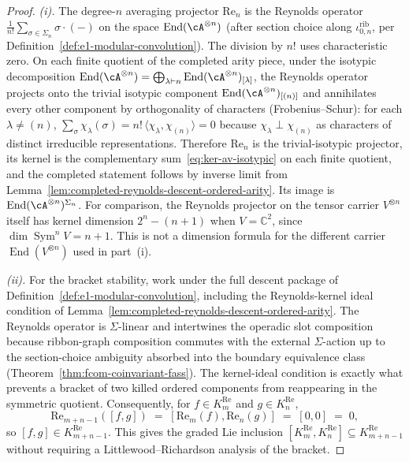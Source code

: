 \begin{proof}
\emph{(i).} The degree-$n$ averaging projector $\mathrm{Re}_n$ is the Reynolds
operator $\frac{1}{n!}\sum_{\sigma\in\Sigma_n}\sigma\cdot(-)$ on the
space $\operatorname{End}(\cA^{\otimes n})$ (after section choice
along $\iota^{\mathrm{rib}}_{0,n}$, per
Definition~\ref{def:e1-modular-convolution}). The division by \(n!\)
uses characteristic zero. On each finite quotient of the completed
arity piece, under the isotypic
decomposition $\operatorname{End}(\cA^{\otimes n})=
\bigoplus_{\lambda\vdash n}\operatorname{End}(\cA^{\otimes n})_{[\lambda]}$,
the Reynolds operator projects onto the trivial isotypic component
$\operatorname{End}(\cA^{\otimes n})_{[(n)]}$ and annihilates every
other component by orthogonality of characters
(Frobenius--Schur): for each $\lambda\neq(n)$,
$\sum_{\sigma}\chi_\lambda(\sigma)=n!\,\langle\chi_\lambda,
\chi_{(n)}\rangle=0$ because $\chi_\lambda\perp\chi_{(n)}$ as
characters of distinct irreducible representations. Therefore
\(\mathrm{Re}_n\) is the trivial-isotypic projector, its kernel
is the complementary sum~\eqref{eq:ker-av-isotypic} on each finite
quotient, and the completed statement follows by inverse limit from
Lemma~\ref{lem:completed-reynolds-descent-ordered-arity}. Its
image is $\operatorname{End}(\cA^{\otimes n})^{\Sigma_n}$.  For
comparison, the Reynolds projector on the tensor carrier
$V^{\otimes n}$ itself has kernel dimension
$2^n-(n+1)$ when $V=\mathbb C^2$, since
$\dim\operatorname{Sym}^nV=n+1$.  This is not a dimension formula
for the different carrier
$\operatorname{End}(V^{\otimes n})$ used in part~\textup{(i)}.

\emph{(ii).} For the bracket stability, work under the full descent
package of Definition~\ref{def:e1-modular-convolution}, including the
Reynolds-kernel ideal condition of
Lemma~\ref{lem:completed-reynolds-descent-ordered-arity}. The Reynolds
operator is $\Sigma$-linear and intertwines the operadic slot
composition because ribbon-graph composition commutes with the external
$\Sigma$-action up to the section-choice ambiguity absorbed into the
boundary equivalence class
\textup{(}Theorem~\ref{thm:fcom-coinvariant-fass}\textup{)}. The
kernel-ideal condition is exactly what prevents a bracket of two killed
ordered components from reappearing in the symmetric quotient.
Consequently, for \(f\in K^{\mathrm{Re}}_m\) and
\(g\in K^{\mathrm{Re}}_n\),
\[
 \mathrm{Re}_{m+n-1}([f,g])
 \;=\;
 [\mathrm{Re}_m(f),\mathrm{Re}_n(g)]
 \;=\;
 [0,0]
 \;=\;
 0,
\]
so \( [f,g]\in K^{\mathrm{Re}}_{m+n-1} \). This gives the
graded Lie inclusion
\([K^{\mathrm{Re}}_m,K^{\mathrm{Re}}_n]\subseteq
K^{\mathrm{Re}}_{m+n-1}\) without requiring a
Littlewood--Richardson analysis of the bracket.


\end{proof}
